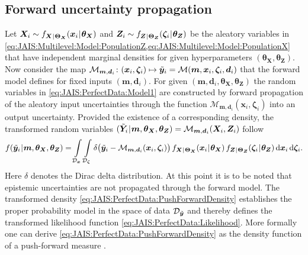 \subsection{Forward uncertainty propagation}
Let \(\bm{X}_i \sim f_{\bm{X} {\:\!}|{\:\!} \bm{\Theta}_{\bm{X}}} (\bm{x}_i {\:\!}|{\:\!} \bm{\theta}_{\bm{X}})\)
and \(\bm{Z}_i \sim f_{\bm{Z} {\:\!}|{\:\!} \bm{\Theta}_{\bm{Z}}} (\bm{\zeta}_i {\:\!}|{\:\!} \bm{\theta}_{\bm{Z}})\)
be the aleatory variables in \cref{eq:JAIS:Multilevel:Model:PopulationZ,eq:JAIS:Multilevel:Model:PopulationX}
that have independent marginal densities for given hyperparameters \((\bm{\theta}_{\bm{X}},\bm{\theta}_{\bm{Z}})\).
Now consider the map \(\mathcal{M}_{\bm{m},\bm{d}_i} \colon (\bm{x}_i,\bm{\zeta}_i) \mapsto \tilde{\bm{y}}_i = \mathcal{M}(\bm{m},\bm{x}_i,\bm{\zeta}_i,\bm{d}_i)\)
that the forward model defines for fixed inputs \((\bm{m},\bm{d}_i)\).
For given \((\bm{m},\bm{d}_i,\bm{\theta}_{\bm{X}},\bm{\theta}_{\bm{Z}})\) the random variables in \cref{eq:JAIS:PerfectData:Model1} are constructed by forward propagation of the aleatory input uncertainties
through the function \(\mathcal{M}_{\bm{m},\bm{d}_i}(\bm{x}_i,\bm{\zeta}_i)\) into an output uncertainty.
Provided the existence of a corresponding density, the transformed random variables \((\tilde{\bm{Y}}_i {\:\!}|{\:\!} \bm{m},\bm{\theta}_{\bm{X}},\bm{\theta}_{\bm{Z}}) = \mathcal{M}_{\bm{m},\bm{d}_i}(\bm{X}_i,\bm{Z}_i)\) follow
\begin{equation} \label{eq:JAIS:PerfectData:PushForwardDensity}
  f (\perfect{\bm{y}}_i \cond \bm{m},\bm{\theta}_{\bm{X}},\bm{\theta}_{\bm{Z}})
  = \int\limits_{\mathcal{D}_{\bm{x}}} \int\limits_{\mathcal{D}_{\bm{\zeta}}} \delta \big( \perfect{\bm{y}}_i - \mathcal{M}_{\bm{m},\bm{d}_i} (\bm{x}_i,\bm{\zeta}_i) \big)
  \, f_{\bm{X} \cond \bm{\Theta}_{\bm{X}}} (\bm{x}_i \cond \bm{\theta}_{\bm{X}}) \, f_{\bm{Z} \cond \bm{\Theta}_{\bm{Z}}} (\bm{\zeta}_i \cond \bm{\theta}_{\bm{Z}})
  \, \mathrm{d} \bm{x}_i \, \mathrm{d} \bm{\zeta}_i.
\end{equation}
Here \(\delta\) denotes the Dirac delta distribution.
At this point it is to be noted that epistemic uncertainties are not propagated through the forward model.
The transformed density \cref{eq:JAIS:PerfectData:PushForwardDensity} establishes the proper probability model in the space of data \(\mathcal{D}_{\tilde{\bm{y}}}\)
and thereby defines the transformed likelihood function \cref{eq:JAIS:PerfectData:Likelihood}.
More formally one can derive \cref{eq:JAIS:PerfectData:PushForwardDensity} as the density function of a push-forward measure \cite{Nagel:SciTech2014:Proc}.

